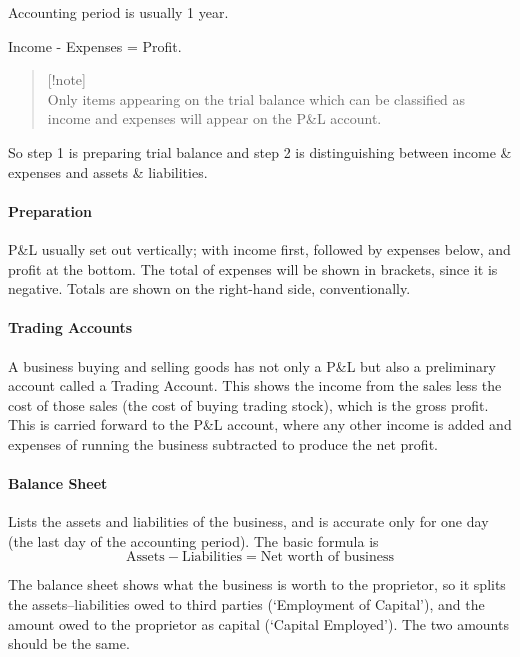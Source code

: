 \documentclass[
]{article}
\begin{document}
Accounting period is usually 1 year.

Income - Expenses = Profit.

\begin{quote}
{[}!note{]}\\
Only items appearing on the trial balance which can be classified as
income and expenses will appear on the P\&L account.
\end{quote}

So step 1 is preparing trial balance and step 2 is distinguishing
between income \& expenses and assets \& liabilities.

\hypertarget{preparation}{%
\paragraph{Preparation}\label{preparation}}

P\&L usually set out vertically; with income first, followed by expenses
below, and profit at the bottom. The total of expenses will be shown in
brackets, since it is negative. Totals are shown on the right-hand side,
conventionally.

\hypertarget{trading-accounts}{%
\paragraph{Trading Accounts}\label{trading-accounts}}

A business buying and selling goods has not only a P\&L but also a
preliminary account called a Trading Account. This shows the income from
the sales less the cost of those sales (the cost of buying trading
stock), which is the gross profit. This is carried forward to the P\&L
account, where any other income is added and expenses of running the
business subtracted to produce the net profit.

\hypertarget{balance-sheet}{%
\paragraph{Balance Sheet}\label{balance-sheet}}

Lists the assets and liabilities of the business, and is accurate only
for one day (the last day of the accounting period). The basic formula
is \[\text{Assets} - \text{Liabilities} = \text{Net worth of business}\]

The balance sheet shows what the business is worth to the proprietor, so
it splits the assets--liabilities owed to third parties (`Employment of
Capital'), and the amount owed to the proprietor as capital (`Capital
Employed'). The two amounts should be the same.
\end{document}

